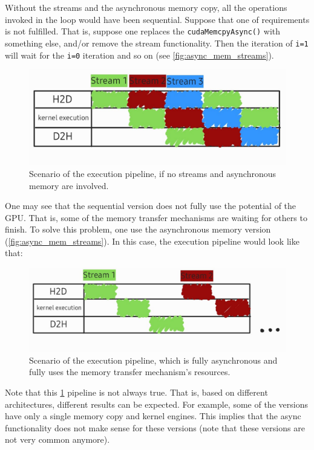 Without the streams and the asynchronous memory copy, all the operations invoked in the loop would have been sequential. Suppose 
that one of requirements is not fulfilled. That is, suppose one replaces the \verb|cudaMemcpyAsync()| with something else, and/or remove the stream functionality.
Then the iteration of \verb|i=1| will wait for the \verb|i=0| iteration and so on (see \ref{fig:async_mem_streams}).

\begin{figure}
  \centering 
  \includegraphics[scale=0.3]{pngs/streams_async2.jpg}
  \caption{Scenario of the execution pipeline, if no streams and asynchronous memory are involved.}
\end{figure}

One may see that the sequential version does not fully use the potential of the GPU. That is, some of the memory 
transfer mechanisms are waiting for others to finish. To solve this problem, one use the asynchronous memory version (\ref{fig:async_mem_streams}).
In this case, the execution pipeline would look like that:

\begin{figure}
  \centering 
  \includegraphics[scale=0.3]{pngs/streams_async1.jpg}
  \caption{Scenario of the execution pipeline, which is fully asynchronous and fully uses the memory transfer mechanism's resources.}
  \label{fig:fully_async_mem}
\end{figure}

Note that this \ref{fig:fully_async_mem} pipeline is not always true. That is, based on different architectures, 
different results can be expected. For example, some of the versions have only a single memory copy and kernel engines. 
This implies that the async functionality does not make sense for these versions (note that these versions are not very common anymore).







